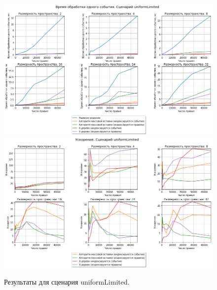 \documentclass[14pt]{article}
\begin{document}
\begin{figure}[p]
    \centering
    \includegraphics[width=1\textwidth]{images/time/uniformLimitedTime.png}    \includegraphics[width=1\textwidth]{images/speedUp/uniformLimitedSpeedUp.png}
    \caption{Результаты для сценария uniformLimited.}
    \label{fig:uniformLimited}
\end{figure}
\end{document}
